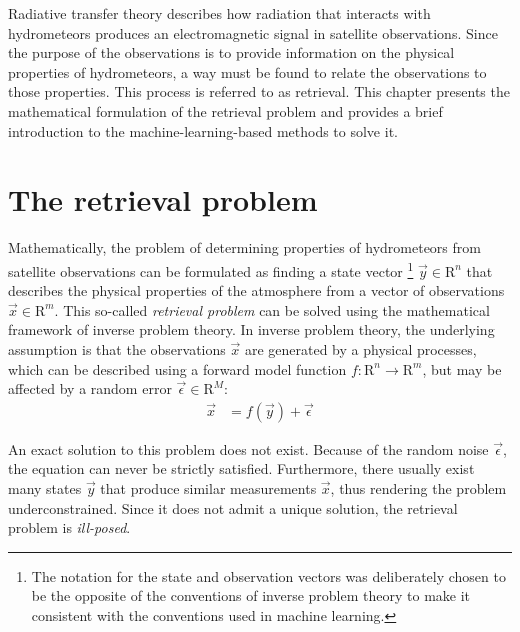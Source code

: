 Radiative transfer theory describes how radiation that interacts with
hydrometeors produces an electromagnetic signal in satellite observations. Since
the purpose of the observations is to provide information on the physical
properties of hydrometeors, a way must be found to relate the observations to
those properties. This process is referred to as retrieval. This chapter
presents the mathematical formulation of the retrieval problem and provides a
brief introduction to the machine-learning-based methods to solve it.

\section{The retrieval problem}
\label{sec:machine_learning:retrieval_problem}


Mathematically, the problem of determining properties of hydrometeors from
satellite observations can be formulated as finding a state vector%
\footnote{ The notation for the state and observation vectors was deliberately
chosen to be the opposite of the conventions of inverse problem theory to make
it consistent with the conventions used in machine learning. }
$\vec{y} \in \mathrm{R}^{n}$ that describes the physical properties of the atmosphere from a
vector of observations $\vec{x} \in \mathrm{R}^{m}$. This so-called
\textit{retrieval problem} can be solved using the mathematical framework of
inverse problem theory. In inverse problem theory, the underlying assumption is
that the observations $\vec{x}$ are generated by a physical processes, which
can be described using a forward model function $f: \mathrm{R}^n \rightarrow
\mathrm{R}^m$, but may be affected by a random error $\vec{\epsilon} \in
\mathrm{R}^M$:
\begin{align}\label{eq:inverse_problem}
  \vec{x} &= f(\vec{y}) + \vec{\epsilon}
\end{align}

An exact solution to this problem does not exist. Because of the random noise
$\vec{\epsilon}$, the equation can never be strictly satisfied. Furthermore,
there usually exist many states $\vec{y}$ that produce similar measurements
$\vec{x}$, thus rendering the problem underconstrained. Since it does not
admit a unique solution, the retrieval problem is \textit{ill-posed}.

